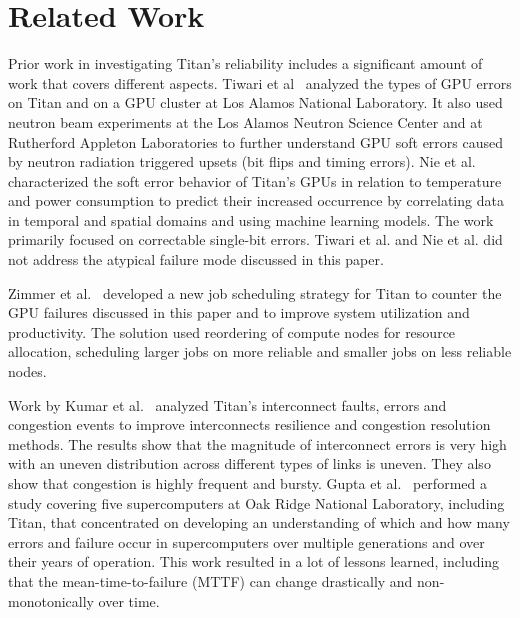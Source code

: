 \section{Related Work}
\label{section:related}

Prior work in investigating Titan's reliability includes a significant amount of work that covers different aspects.
%
Tiwari et al~\cite{7056044} analyzed the types of GPU errors on Titan and on a GPU cluster at Los Alamos National Laboratory. It also used neutron beam experiments at the Los Alamos Neutron Science Center and at Rutherford Appleton Laboratories to further understand GPU soft errors caused by neutron radiation triggered upsets (bit flips and timing errors).
%
Nie et al.~\cite{nie17characterizing,nie18machine} characterized the soft error behavior of Titan's GPUs in relation to temperature and power consumption to predict their increased occurrence by correlating data in temporal and spatial domains and using machine learning models. The work primarily focused on correctable single-bit errors.
%
Tiwari et al. and Nie et al. did not address the atypical failure mode discussed in this paper.

Zimmer et al.~\cite{8665764} developed a new job scheduling strategy for Titan to counter the GPU failures discussed in this paper and to improve system utilization and productivity. The solution used reordering of compute nodes for resource allocation, scheduling larger jobs on more reliable and smaller jobs on less reliable nodes.


Work by Kumar et al.~\cite{kumar18understanding} analyzed Titan's interconnect faults, errors and congestion events to improve interconnects resilience and congestion resolution methods. The results show that the magnitude of interconnect errors is very high with an uneven distribution across different types of links is uneven. They also show that congestion is highly frequent and bursty.
%
Gupta et al.~\cite{gupta17failures} performed a study covering five supercomputers at Oak Ridge National Laboratory, including Titan, that concentrated on developing an understanding of which and how many errors and failure occur in supercomputers over multiple generations and over their years of operation. This work resulted in a lot of lessons learned, including that the mean-time-to-failure (MTTF) can change drastically and non-monotonically over time. 

